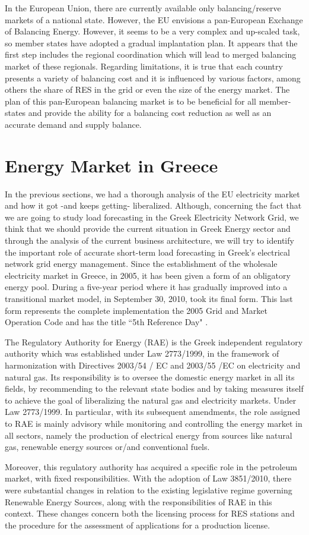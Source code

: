 \par In the European Union, there are currently available only balancing/reserve markets of a national state. However, the EU envisions a pan-European Exchange of Balancing Energy. However, it seems to be a very complex and up-scaled task, so member states have adopted a gradual implantation plan. It appears that the first step includes the regional coordination which will lead to merged balancing market of these regionals.  Regarding limitations, it is true that each country presents a variety of balancing cost and it is influenced by various factors, among others the share of RES in the grid or even the size of the energy market. The plan of this pan-European balancing market is to be beneficial for all member-states and provide the ability for a balancing cost reduction as well as an accurate demand and supply balance. 
\section{Energy Market in Greece}
In the previous sections, we had a thorough analysis of the EU electricity market and how it got -and keeps getting- liberalized. Although, concerning the fact that we are going to study load forecasting in the Greek Electricity Network Grid, we think that we should provide the current situation in Greek Energy sector and through the analysis of the current business architecture, we will try to identify the important role of accurate short-term load forecasting in Greek's electrical network grid energy management. Since the establishment of the wholesale electricity market in Greece, in 2005, it has been given a form of an obligatory energy pool. During a five-year period where it has gradually improved into a transitional market model, in September 30, 2010, took its final form. This last form represents the complete implementation the 2005 Grid and Market Operation Code and has the title “5th Reference Day" \cite{energia}.
\par The Regulatory Authority for Energy (RAE) is the Greek independent regulatory authority which was established under Law 2773/1999, in the framework of harmonization with Directives 2003/54 / EC and 2003/55 /EC on electricity and natural gas. Its responsibility is to oversee the domestic energy market in all its fields, by recommending to the relevant state bodies and by taking measures itself to achieve the goal of liberalizing the natural gas and electricity markets. Under Law 2773/1999. In particular, with its subsequent amendments, the role assigned to RAE is mainly advisory while monitoring and controlling the energy market in all sectors, namely the production of electrical energy from sources like natural gas, renewable energy sources or/and conventional fuels. 
\par Moreover, this regulatory authority has acquired a specific role in the petroleum market, with fixed responsibilities. With the adoption of Law 3851/2010, there were substantial changes in relation to the existing legislative regime governing Renewable Energy Sources, along with the responsibilities of RAE in this context. These changes concern both the licensing process for RES stations and the procedure for the assessment of applications for a production license.
